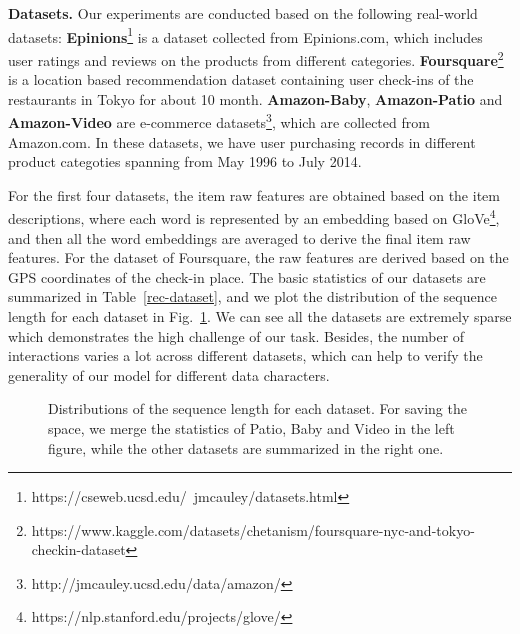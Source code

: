 \documentclass[conference]{IEEEtran}
\theoremstyle{definition}
\theoremstyle{theorem}
\theoremstyle{proof}
\theoremstyle{remark}
\begin{document}
\textbf{Datasets.}
Our experiments are conducted based on the following real-world datasets:
\textbf{Epinions}\footnote{https://cseweb.ucsd.edu/~jmcauley/datasets.html} is a dataset collected from Epinions.com, which includes user ratings and reviews on the products from different categories.
{\textbf{Foursquare}\footnote{https://www.kaggle.com/datasets/chetanism/foursquare-nyc-and-tokyo-checkin-dataset} is a location based recommendation dataset containing user check-ins of the restaurants in Tokyo for about 10 month.}
\textbf{Amazon-Baby}, \textbf{Amazon-Patio} and \textbf{Amazon-Video} are e-commerce datasets\footnote{http://jmcauley.ucsd.edu/data/amazon/}, which are collected from Amazon.com. In these datasets, we have user purchasing records in different product categoties spanning from May 1996 to July 2014. 

For the first four datasets, the item raw features are obtained based on the item descriptions, where each word is represented by an embedding based on GloVe\footnote{https://nlp.stanford.edu/projects/glove/}, and then all the word embeddings are averaged to derive the final item raw features.
For the dataset of Foursquare, the raw features are derived based on the GPS coordinates of the check-in place.
{The basic statistics of our datasets are summarized in Table~\ref{rec-dataset}, and we plot the distribution of the sequence length for each dataset in Fig.~\ref{fig_data}.
We can see all the datasets are extremely sparse which demonstrates the high challenge of our task.
Besides, the number of interactions varies a lot across different datasets, which can help to verify the generality of our model for different data characters.
}


\begin{figure}[t]
	\centering
	\setlength{\fboxrule}{0.pt}
	\setlength{\fboxsep}{0.pt}
	\vspace{-0.3cm}
	\caption{{{Distributions of the sequence length for each dataset.
	For saving the space, we merge the statistics of Patio, Baby and Video in the left figure, while the other datasets are summarized in the right one.}}}
	\label{fig_data}
	\vspace{-0.2cm}
\end{figure}
\end{document}
